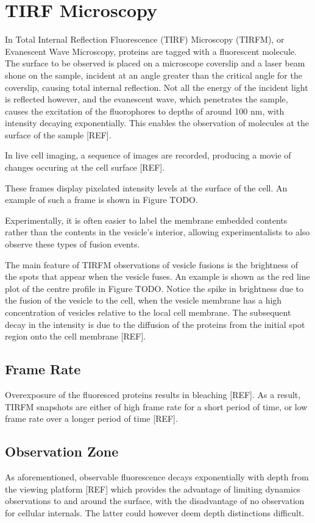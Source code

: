 \documentclass{report}
\begin{document}
\section{TIRF Microscopy}
In Total Internal Reflection Fluorescence (TIRF) Microscopy (TIRFM), or Evanescent Wave Microscopy, proteins are tagged with a fluorescent molecule. The surface to be observed is placed on a microscope coverslip and a laser beam shone on the sample, incident at an angle greater than the critical angle for the coverslip, causing total internal reflection. Not all the energy of the incident light is reflected however, and the evanescent wave, which penetrates the sample, causes the excitation of the fluorophores to depths of around 100 nm, with intensity decaying exponentially. This enables the observation of molecules at the surface of the sample [REF].

In live cell imaging, a sequence of images are recorded, producing a movie of changes occuring at the cell surface [REF].

These frames display pixelated intensity levels at the surface of the cell. An example of such a frame is shown in Figure TODO.

Experimentally, it is often easier to label the membrane embedded contents rather than the contents in the vesicle's interior, allowing experimentalists to also observe these types of fusion events.

The main feature of TIRFM observations of vesicle fusions is the brightness of the spots that appear when the vesicle fuses. An example is shown as the red line plot of the centre profile in Figure TODO. Notice the spike in brightness due to the fusion of the vesicle to the cell, when the vesicle membrane has a high concentration of vesicles relative to the local cell membrane. The subsequent decay in the intensity is due to the diffusion of the proteins from the initial spot region onto the cell membrane [REF].

\subsection{Frame Rate}
Overexposure of the fluoresced proteins results in bleaching [REF]. As a result, TIRFM snapshots are either of high frame rate for a short period of time, or low frame rate over a longer period of time [REF].

\subsection{Observation Zone}
As aforementioned, observable fluorescence decays exponentially with depth from the viewing platform [REF] which provides the advantage of limiting dynamics observations to and around the surface, with the disadvantage of no observation for cellular internals. The latter could however deem depth distinctions difficult.
\end{document}
